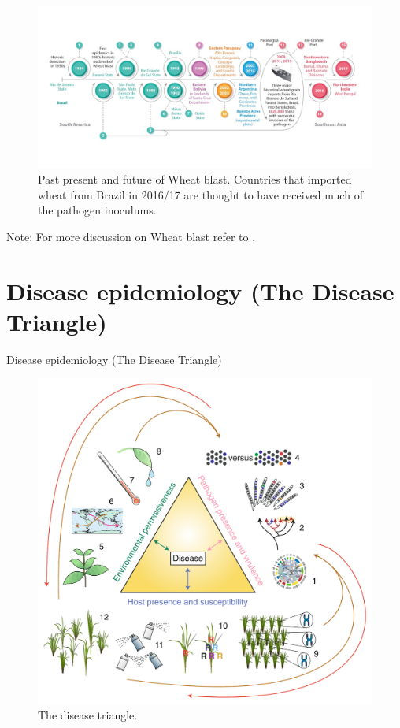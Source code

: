 \documentclass[11pt,dvipsnames,ignorenonframetext,aspectratio=169]{beamer}
\begin{document}
\begin{frame}{}
\protect\hypertarget{section-4}{}
\begin{figure}
\includegraphics[width=0.86\linewidth]{../images/wheat_blast_distribution_due_brazil} \caption{Past present and future of Wheat blast. Countries that imported wheat from Brazil in 2016/17 are thought to have received much of the pathogen inoculums.}\label{fig:wheat-blast}
\end{figure}

\footnotesize Note: For more discussion on Wheat blast refer to
\citet{ceresini2018wheat}.
\end{frame}

\hypertarget{disease-epidemiology-the-disease-triangle}{%
\section{Disease epidemiology (The Disease
Triangle)}\label{disease-epidemiology-the-disease-triangle}}

\begin{frame}{Disease epidemiology (The Disease Triangle)}
\begin{figure}
\includegraphics[width=0.45\linewidth]{../images/disease_triangle} \caption{The disease triangle.}\label{fig:disease-triangle}
\end{figure}
\end{frame}
\end{document}
